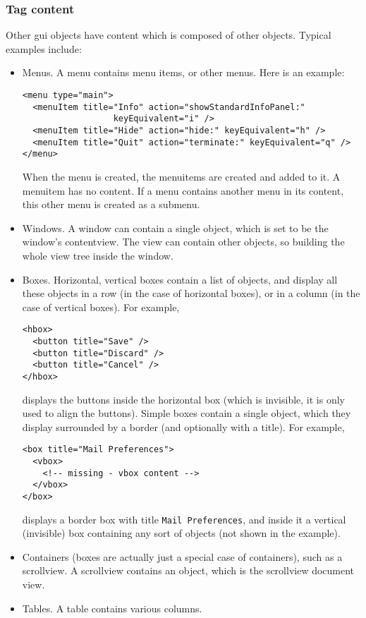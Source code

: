 \subsubsection{Tag content}
Other gui objects have content which is composed of other objects.
Typical examples include:
\begin{itemize}
\item Menus.  A menu contains menu items, or other menus.  Here is an
  example:
\begin{verbatim}
<menu type="main">
  <menuItem title="Info" action="showStandardInfoPanel:" 
                  keyEquivalent="i" />
  <menuItem title="Hide" action="hide:" keyEquivalent="h" />
  <menuItem title="Quit" action="terminate:" keyEquivalent="q" />
</menu>
\end{verbatim}
  When the menu is created, the menuitems are created and added to it.
  A menuitem has no content.  If a menu contains another menu in its
  content, this other menu is created as a submenu.
\item Windows.  A window can contain a single object, which is set to
  be the window's contentview.  The view can contain other objects, so
  building the whole view tree inside the window.
\item Boxes.  Horizontal, vertical boxes contain a list of objects,
  and display all these objects in a row (in the case of horizontal
  boxes), or in a column (in the case of vertical boxes).  For
  example,
\begin{verbatim}
<hbox>
  <button title="Save" />
  <button title="Discard" />
  <button title="Cancel" />
</hbox>
\end{verbatim}
  displays the buttons inside the horizontal box (which is invisible,
  it is only used to align the buttons).  Simple boxes contain a
  single object, which they display surrounded by a border (and
  optionally with a title).  For example,
\begin{verbatim}
<box title="Mail Preferences">
  <vbox>
    <!-- missing - vbox content -->
  </vbox>
</box>
\end{verbatim}
  displays a border box with title \texttt{Mail Preferences}, and
  inside it a vertical (invisible) box containing any sort of objects
  (not shown in the example).
\item Containers (boxes are actually just a special case of
  containers), such as a scrollview.  A scrollview contains an object,
  which is the scrollview document view.
\item Tables.  A table contains various columns.
\end{itemize}

